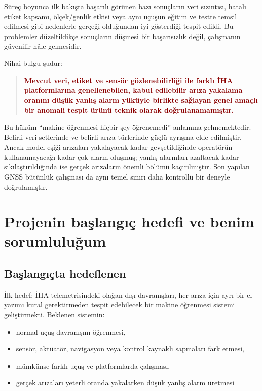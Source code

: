 \documentclass[11pt,a4paper]{article}
\newcommand{\resultno}[1]{\textcolor{darkred}{\textbf{#1}}}
\begin{document}
Süreç boyunca ilk bakışta başarılı görünen bazı sonuçların veri sızıntısı, hatalı
etiket kapsamı, ölçek/genlik etkisi veya aynı uçuşun eğitim ve testte temsil
edilmesi gibi nedenlerle gerçeği olduğundan iyi gösterdiği tespit edildi. Bu
problemler düzeltildikçe sonuçların düşmesi bir başarısızlık değil, çalışmanın
güvenilir hâle gelmesidir.

Nihai bulgu şudur:

\begin{quote}
\resultno{Mevcut veri, etiket ve sensör gözlenebilirliği ile farklı İHA
platformlarına genellenebilen, kabul edilebilir arıza yakalama oranını düşük
yanlış alarm yüküyle birlikte sağlayan genel amaçlı bir anomali tespit ürünü
teknik olarak doğrulanamamıştır.}
\end{quote}

Bu hüküm ``makine öğrenmesi hiçbir şey öğrenemedi'' anlamına gelmemektedir.
Belirli veri setlerinde ve belirli arıza türlerinde güçlü ayrışma elde edilmiştir.
Ancak model eşiği arızaları yakalayacak kadar gevşetildiğinde operatörün
kullanamayacağı kadar çok alarm oluşmuş; yanlış alarmları azaltacak kadar
sıkılaştırıldığında ise gerçek arızaların önemli bölümü kaçırılmıştır. Son yapılan
GNSS bütünlük çalışması da aynı temel sınırı daha kontrollü bir deneyle
doğrulamıştır.

\section{Projenin başlangıç hedefi ve benim sorumluluğum}

\subsection{Başlangıçta hedeflenen}

İlk hedef; İHA telemetrisindeki olağan dışı davranışları, her arıza için ayrı bir
el yazımı kural gerektirmeden tespit edebilecek bir makine öğrenmesi sistemi
geliştirmekti. Beklenen sistemin:

\begin{itemize}
  \item normal uçuş davranışını öğrenmesi,
  \item sensör, aktüatör, navigasyon veya kontrol kaynaklı sapmaları fark etmesi,
  \item mümkünse farklı uçuş ve platformlarda çalışması,
  \item gerçek arızaları yeterli oranda yakalarken düşük yanlış alarm üretmesi
\end{itemize}
\end{document}
